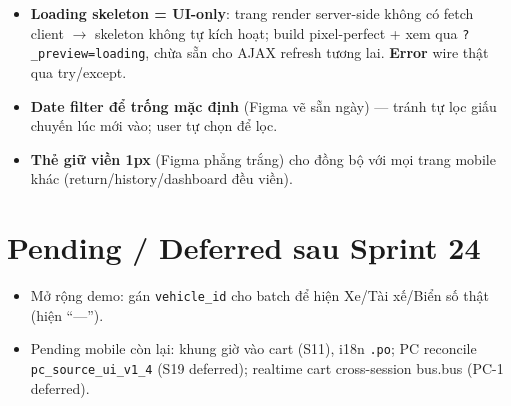 \begin{itemize}
  \item \textbf{Loading skeleton = UI-only}: trang render server-side không có fetch client \(\rightarrow\) skeleton không tự kích hoạt; build pixel-perfect + xem qua \texttt{?\_preview=loading}, chừa sẵn cho AJAX refresh tương lai. \textbf{Error} wire thật qua try/except.
  \item \textbf{Date filter để trống mặc định} (Figma vẽ sẵn ngày) --- tránh tự lọc giấu chuyến lúc mới vào; user tự chọn để lọc.
  \item \textbf{Thẻ giữ viền 1px} (Figma phẳng trắng) cho đồng bộ với mọi trang mobile khác (return/history/dashboard đều viền).
\end{itemize}

\section{Pending / Deferred sau Sprint 24}

\begin{itemize}
  \item Mở rộng demo: gán \texttt{vehicle\_id} cho batch để hiện Xe/Tài xế/Biển số thật (hiện ``---'').
  \item Pending mobile còn lại: khung giờ vào cart (S11), i18n \texttt{.po}; PC reconcile \texttt{pc\_source\_ui\_v1\_4} (S19 deferred); realtime cart cross-session bus.bus (PC-1 deferred).
\end{itemize}
